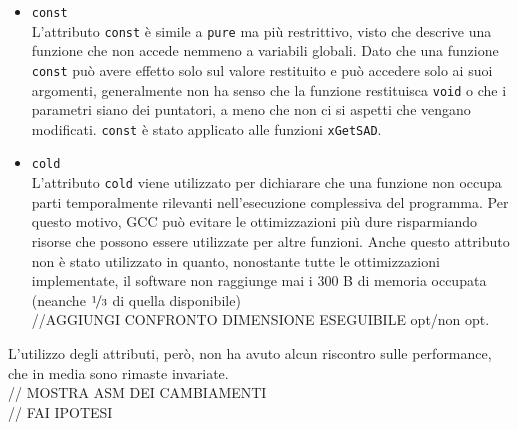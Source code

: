\begin{itemize}
	\item\verb|const|\\
	L'attributo \verb|const| è simile a \verb|pure| ma più restrittivo, visto 
	che descrive una funzione che non accede nemmeno a variabili globali.
	Dato che una funzione \verb|const| può avere effetto solo sul valore 
	restituito e può accedere solo ai suoi argomenti, generalmente non ha senso 
	che la funzione restituisca \verb|void| o che i parametri siano dei 
	puntatori, a meno che non ci si aspetti che vengano modificati. 
	\verb|const| è stato applicato alle funzioni \verb|xGetSAD|.
	
	\item\verb|cold|\\
	L'attributo \verb|cold| viene utilizzato per dichiarare che una funzione 
	non occupa parti temporalmente rilevanti nell'esecuzione complessiva del 
	programma. Per questo motivo, GCC può evitare le ottimizzazioni più dure 
	risparmiando risorse che possono essere utilizzate per altre funzioni. 
	Anche questo attributo non è stato utilizzato in quanto, nonostante tutte 
	le ottimizzazioni implementate, il software non raggiunge mai i $300$ B di 
	memoria occupata (neanche $\nicefrac{1}{3}$ di quella disponibile) 
	\\ //AGGIUNGI CONFRONTO DIMENSIONE ESEGUIBILE opt/non opt.
\end{itemize}

L'utilizzo degli attributi, però, non ha avuto alcun riscontro sulle 
performance, che in media sono rimaste invariate. \\
// MOSTRA ASM DEI CAMBIAMENTI \\
// FAI IPOTESI

